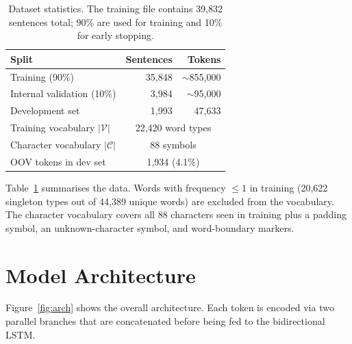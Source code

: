 \documentclass[11pt]{article}
\begin{document}
\begin{table}[t]
\centering
\small
\begin{tabular}{lrr}
\toprule
\textbf{Split} & \textbf{Sentences} & \textbf{Tokens} \\
\midrule
Training (90\%) & 35,848 & $\sim$855{,}000 \\
Internal validation (10\%) & 3,984 & $\sim$95{,}000 \\
Development set            & 1,993  & 47,633 \\
\midrule
Training vocabulary $|\mathcal{V}|$ & \multicolumn{2}{c}{22,420 word types} \\
Character vocabulary $|\mathcal{C}|$ & \multicolumn{2}{c}{88 symbols} \\
OOV tokens in dev set & \multicolumn{2}{c}{1,934 (4.1\%)} \\
\bottomrule
\end{tabular}
\caption{Dataset statistics.  The training file contains 39,832 sentences
total; 90\% are used for training and 10\% for early stopping.}
\label{tab:data}
\end{table}

Table~\ref{tab:data} summarises the data.  Words with frequency
$\leq 1$ in training (20,622 singleton types out of 44,389 unique words)
are excluded from the vocabulary.  The character vocabulary covers all 88
characters seen in training plus a padding symbol, an unknown-character
symbol, and word-boundary markers.

\section{Model Architecture}
\label{sec:model}

Figure~\ref{fig:arch} shows the overall architecture.  Each token is encoded
via two parallel branches that are concatenated before being fed to the
bidirectional LSTM.
\end{document}
